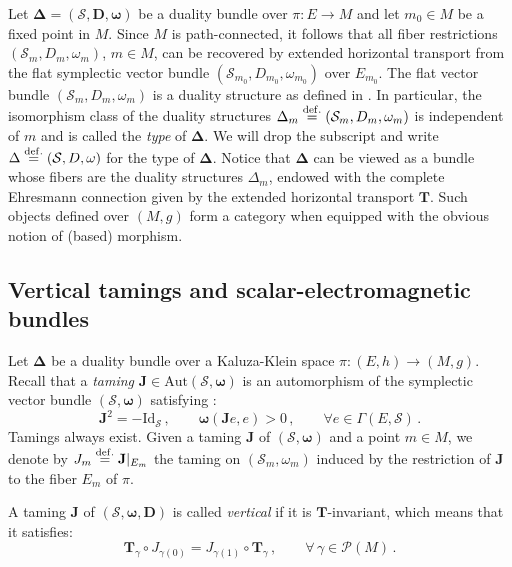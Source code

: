 \documentclass[10pt, cmp, numbook, final, a4paper]{svjour}
\newcommand{\bDelta}{\boldsymbol{\Delta}}
\newcommand{\Aut}{\mathrm{Aut}}
\newcommand{\eqdef}{\stackrel{{\rm def.}}{=}}
\def\bD{\mathbb{D}}
\def\bJ{\mathbf{J}}
\def\bomega{\boldsymbol{\omega}}
\def\bJ{\mathbf{J}}
\newcommand{\be}{\begin{equation*}}
\newcommand{\ee}{\end{equation*}}
\def\cP{\mathcal{P}}
\def\cS{\mathcal{S}}
\def\mT{\mathbf{T}}
\def\bD{\mathbf{D}}
\def\bomega{\boldsymbol{\omega}}
\def\bcS{\boldsymbol{\mathcal{S}}}
\def\bD{\mathbf{D}}
\begin{document}
\noindent
Let $\bDelta=(\bcS,\bD,\bomega)$ be a duality bundle over $\pi\colon
E\to M$ and let $m_{0}\in M$ be a fixed point in $M$. Since $M$ is
path-connected, it follows that all fiber restrictions
$(\cS_m,D_m,\omega_m)$, $m\in M$, can be recovered by extended
horizontal transport from the flat symplectic vector bundle
$(\cS_{m_0},D_{m_0},\omega_{m_0})$ over $E_{m_0}$. The flat vector
bundle $(\cS_m,D_m,\omega_m)$ is a duality structure as defined in
\cite{GESM}. In particular, the isomorphism class of the duality
structures $\Delta_m\eqdef (\cS_m,D_m,\omega_m)$ is independent of $m$
and is called the {\em type} of $\bDelta$. We will drop the subscript
and write $\Delta\eqdef (\cS,D,\omega)$ for the type of
$\bDelta$. Notice that $\bDelta$ can be viewed as a bundle whose
fibers are the duality structures $\Delta_m$, endowed with the
complete Ehresmann connection given by the extended horizontal
transport $\mT$. Such objects defined over $(M,g)$ form a category
when equipped with the obvious notion of (based) morphism.

\subsection{Vertical tamings and scalar-electromagnetic bundles}

Let $\bDelta$ be a duality bundle over a Kaluza-Klein space
$\pi:(E,h)\rightarrow (M,g)$. Recall that a \emph{taming}
$\bJ\in\Aut(\bcS,\bomega)$ is an automorphism of the symplectic vector
bundle $(\bcS,\bomega)$ satisfying \cite{DuffSalamon}:
\begin{equation*}
\bJ^{2} = -\mathrm{Id}_{\bcS}\, , \qquad \bomega(\bJ e, e) >0\, , \qquad \forall e\in \Gamma(E,\bcS)\, .
\end{equation*}
Tamings always exist. Given a taming $\bJ$ of $(\bcS,\bomega)$ and a
point $m\in M$, we denote by $J_m\eqdef \bJ|_{E_m}$ the taming on
$(\cS_m,\omega_m)$ induced by the restriction of $\bJ$ to the fiber
$E_m$ of $\pi$.
	
\begin{definition}
A taming $\bJ$ of $(\bcS,\bomega,\bD)$ is called {\em vertical} if it
is $\mT$-invariant, which means that it satisfies:
\be
\mT_{\gamma}\circ J_{\gamma(0)}=J_{\gamma(1)}\circ \mT_\gamma\, , \qquad \forall\, \gamma\in \cP(M)\, .
\ee
\end{definition}
	
\end{document}
